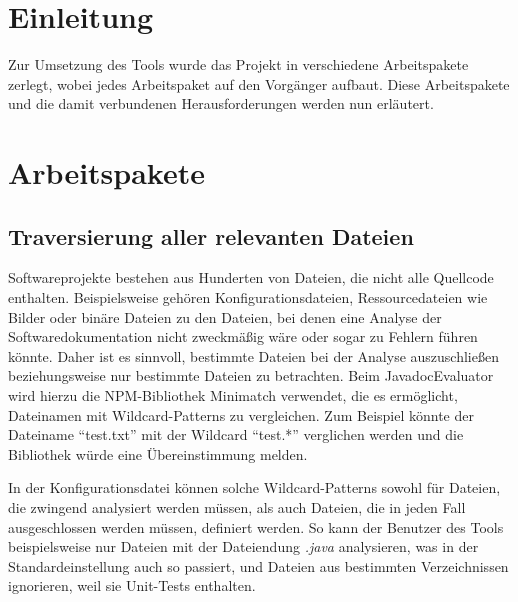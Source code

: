 \section{Einleitung}
Zur Umsetzung des Tools wurde das Projekt in verschiedene Arbeitspakete zerlegt, wobei jedes Arbeitspaket auf den Vorgänger aufbaut. Diese Arbeitspakete und die damit verbundenen Herausforderungen werden nun erläutert.

  
\section{Arbeitspakete}
\subsection{Traversierung aller relevanten Dateien} 
Softwareprojekte bestehen aus Hunderten von Dateien, die nicht alle Quellcode enthalten. Beispielsweise gehören Konfigurationsdateien, Ressourcedateien wie Bilder oder binäre Dateien zu den Dateien, bei denen eine Analyse der Softwaredokumentation nicht zweckmäßig wäre oder sogar zu Fehlern führen könnte. Daher ist es sinnvoll, bestimmte Dateien bei der Analyse auszuschließen beziehungsweise nur bestimmte Dateien zu betrachten. Beim JavadocEvaluator wird hierzu die NPM-Bibliothek Minimatch \cite{Minimatch} verwendet, die es ermöglicht, Dateinamen mit Wildcard-Patterns zu vergleichen. Zum Beispiel könnte der Dateiname \enquote{test.txt} mit der Wildcard \enquote{test.*} verglichen werden und die Bibliothek würde eine Übereinstimmung melden.

  

In der Konfigurationsdatei können solche Wildcard-Patterns sowohl für Dateien, die zwingend analysiert werden müssen, als auch Dateien, die in jeden Fall ausgeschlossen werden müssen, definiert werden. So kann der Benutzer des Tools beispielsweise nur Dateien mit der Dateiendung \textit{.java} analysieren, was in der Standardeinstellung auch so passiert, und Dateien aus bestimmten Verzeichnissen ignorieren, weil sie Unit-Tests enthalten.   

  

